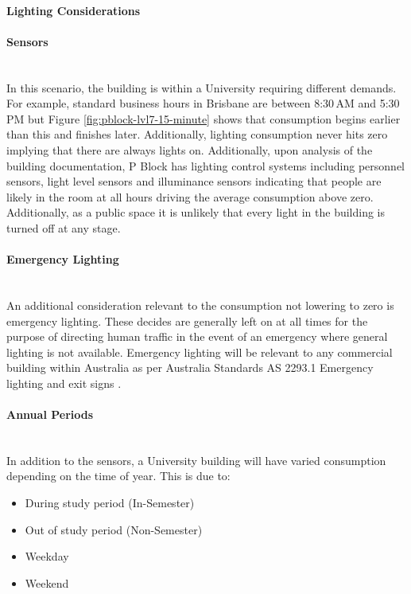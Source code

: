 \paragraph{Lighting Considerations}
\paragraph{Sensors}
~\\
In this scenario, the building is within a University requiring different demands. For example, standard business hours in Brisbane are between 8:30\,AM and 5:30\,PM but Figure \ref{fig:pblock-lvl7-15-minute} shows that consumption begins earlier than this and finishes later. Additionally, lighting consumption never hits zero implying that there are always lights on. Additionally, upon analysis of the building documentation, P Block has lighting control systems including personnel sensors, light level sensors and illuminance sensors indicating that people are likely in the room at all hours driving the average consumption above zero. Additionally, as a public space it is unlikely that every light in the building is turned off at any stage. 

\paragraph{Emergency Lighting}
~\\
An additional consideration relevant to the consumption not lowering to zero is emergency lighting. These decides are generally left on at all times for the purpose of directing human traffic in the event of an emergency where general lighting is not available. Emergency lighting will be relevant to any commercial building within Australia as per Australia Standards AS 2293.1 Emergency lighting and exit signs \cite{StandardsAustralia2293}. 

\paragraph{Annual Periods}
~\\
In addition to the sensors, a University building will have varied consumption depending on the time of year. This is due to:
\newline
\begin{itemize} [noitemsep]
	\item During study period (In-Semester)
	\item Out of study period (Non-Semester)
	\item Weekday
	\item Weekend
\end{itemize}

